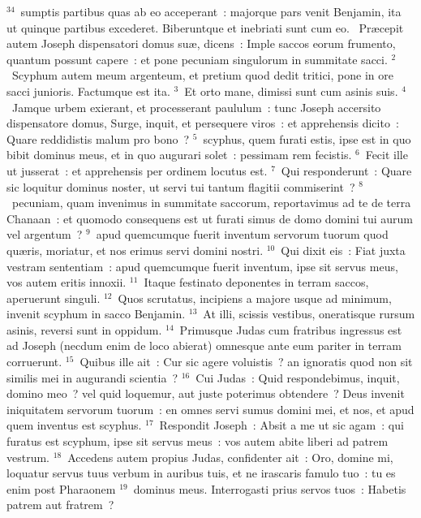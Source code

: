 ${}^{34}$~sumptis partibus quas ab eo acceperant~: majorque pars venit Benjamin, ita ut quinque partibus excederet. Biberuntque et inebriati sunt cum eo.
~Pr\ae cepit autem Joseph dispensatori domus su\ae , dicens~: Imple saccos eorum frumento, quantum possunt capere~: et pone pecuniam singulorum in summitate sacci.
${}^{2}$~Scyphum autem meum argenteum, et pretium quod dedit tritici, pone in ore sacci junioris. Factumque est ita.
${}^{3}$~Et orto mane, dimissi sunt cum asinis suis.
${}^{4}$~Jamque urbem exierant, et processerant paululum~: tunc Joseph accersito dispensatore domus, Surge, inquit, et persequere viros~: et apprehensis dicito~: Quare reddidistis malum pro bono~?
${}^{5}$~scyphus, quem furati estis, ipse est in quo bibit dominus meus, et in quo augurari solet~: pessimam rem fecistis.
${}^{6}$~Fecit ille ut jusserat~: et apprehensis per ordinem locutus est.
${}^{7}$~Qui responderunt~: Quare sic loquitur dominus noster, ut servi tui tantum flagitii commiserint~?
${}^{8}$~pecuniam, quam invenimus in summitate saccorum, reportavimus ad te de terra Chanaan~: et quomodo consequens est ut furati simus de domo domini tui aurum vel argentum~?
${}^{9}$~apud quemcumque fuerit inventum servorum tuorum quod qu\ae ris, moriatur, et nos erimus servi domini nostri.
${}^{10}$~Qui dixit eis~: Fiat juxta vestram sententiam~: apud quemcumque fuerit inventum, ipse sit servus meus, vos autem eritis innoxii.
${}^{11}$~Itaque festinato deponentes in terram saccos, aperuerunt singuli.
${}^{12}$~Quos scrutatus, incipiens a majore usque ad minimum, invenit scyphum in sacco Benjamin.
${}^{13}$~At illi, scissis vestibus, oneratisque rursum asinis, reversi sunt in oppidum.
${}^{14}$~Primusque Judas cum fratribus ingressus est ad Joseph (necdum enim de loco abierat) omnesque ante eum pariter in terram corruerunt.
${}^{15}$~Quibus ille ait~: Cur sic agere voluistis~? an ignoratis quod non sit similis mei in augurandi scientia~?
${}^{16}$~Cui Judas~: Quid respondebimus, inquit, domino meo~? vel quid loquemur, aut juste poterimus obtendere~? Deus invenit iniquitatem servorum tuorum~: en omnes servi sumus domini mei, et nos, et apud quem inventus est scyphus.
${}^{17}$~Respondit Joseph~: Absit a me ut sic agam~: qui furatus est scyphum, ipse sit servus meus~: vos autem abite liberi ad patrem vestrum.
${}^{18}$~Accedens autem propius Judas, confidenter ait~: Oro, domine mi, loquatur servus tuus verbum in auribus tuis, et ne irascaris famulo tuo~: tu es enim post Pharaonem
${}^{19}$~dominus meus. Interrogasti prius servos tuos~: Habetis patrem aut fratrem~?
